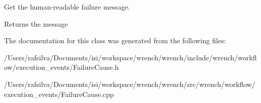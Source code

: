 Get the human-\/readable failure message. 

\begin{DoxyReturn}{Returns}
the message 
\end{DoxyReturn}


The documentation for this class was generated from the following files\+:\begin{DoxyCompactItemize}
\item 
/\+Users/rafsilva/\+Documents/isi/workspace/wrench/wrench/include/wrench/workflow/execution\+\_\+events/Failure\+Cause.\+h\item 
/\+Users/rafsilva/\+Documents/isi/workspace/wrench/wrench/src/wrench/workflow/execution\+\_\+events/Failure\+Cause.\+cpp\end{DoxyCompactItemize}
